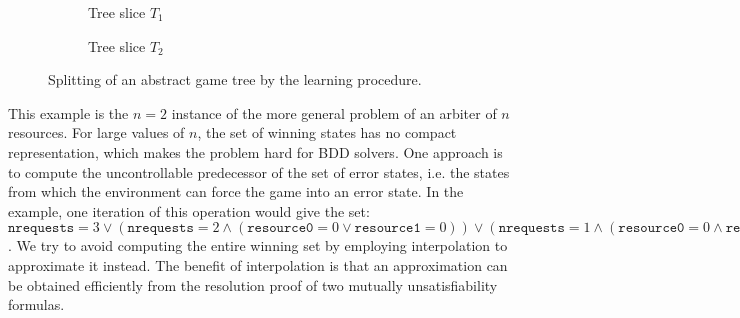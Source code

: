 \begin{figure}[t]
    \begin{subfigure}[t]{.5\textwidth}
        \centering
        \caption{Tree slice $T_1$}
        \label{fig:treef1}
    \end{subfigure}%
    \begin{subfigure}[t]{.5\textwidth}
        \centering
        \caption{Tree slice $T_2$}
        \label{fig:treef2}
    \end{subfigure}
    \caption{Splitting of an abstract game tree by the learning procedure.}
    \label{fig:interpolanttrees}
\end{figure}



This example is the $n=2$ instance of the more general problem of an arbiter of $n$ resources. For large values of $n$, the set of winning states has no compact representation, which makes the problem hard for BDD solvers. One approach is to compute the uncontrollable predecessor of the set of error states, i.e. the states from which the environment can force the game into an error state. In the example, one iteration of this operation would give the set: $\texttt{nrequests} = 3 \lor (\texttt{nrequests} = 2 \land ( \texttt{resource0} = 0 \lor \texttt{resource1} = 0)) \lor (\texttt{nrequests} = 1 \land (\texttt{resource0} = 0 \land \texttt{resource1} = 0))$. We try to avoid computing the entire winning set by employing interpolation to approximate it instead. The benefit of interpolation is that an approximation can be obtained efficiently from the resolution proof of two mutually unsatisfiability formulas.

